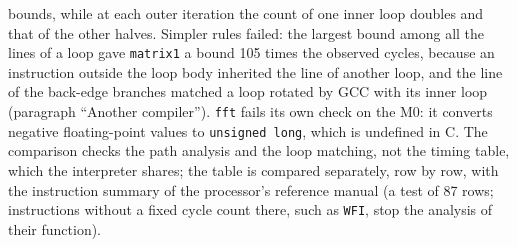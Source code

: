 \documentclass[oneside,english]{amsart}
\numberwithin{equation}{section}
\theoremstyle{plain}
\theoremstyle{definition}
\theoremstyle{plain}
\theoremstyle{plain}
\theoremstyle{remark}
\begin{document}
bounds, while at each outer iteration the count of one inner loop doubles and that of the other halves. Simpler rules failed: the largest bound among all the lines of a loop gave \texttt{matrix1} a bound 105 times the observed cycles, because an instruction outside the loop body inherited the line of another loop, and the line of the back-edge branches matched a loop rotated by GCC with its inner loop (paragraph ``Another compiler''). \texttt{fft} fails its own check on the M0: it converts negative floating-point values to \texttt{unsigned long}, which is undefined in C. The comparison checks the path analysis and the loop matching, not the timing table, which the interpreter shares; the table is compared separately, row by row, with the instruction summary of the processor's reference manual \cite{armCortexM0trm} (a test of 87 rows; instructions without a fixed cycle count there, such as \texttt{WFI}, stop the analysis of their function).
\end{document}
